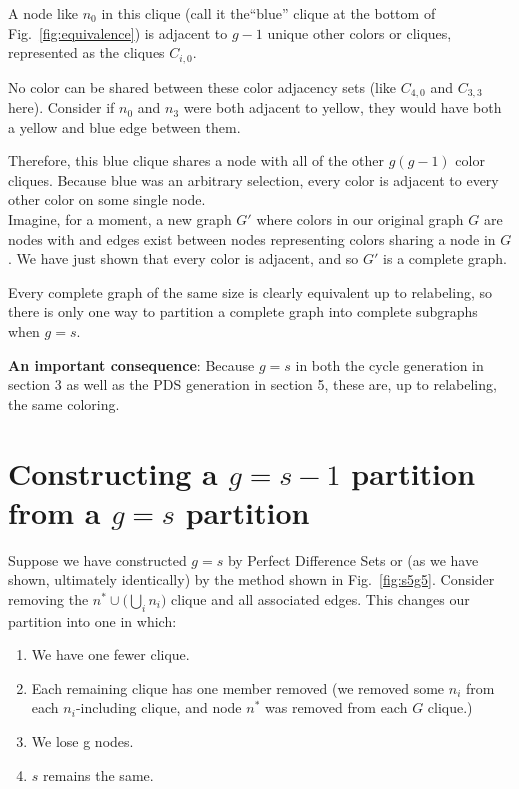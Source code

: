 \documentclass[11pt, oneside]{article} 	%
\begin{document}
A node like $n_0$ in this clique (call it the``blue'' clique at the bottom of Fig.~\ref{fig:equivalence}) is adjacent to $g-1$ unique other colors or cliques, represented as the cliques $C_{i,0}$.

No color can be shared between these color adjacency sets (like $C_{4,0}$ and $C_{3,3}$ here). Consider if $n_0$ and $n_3$ were both adjacent to yellow, they would have both a yellow and blue edge between them.

Therefore, this blue clique shares a node with all of the other $g(g-1)$ color cliques. Because blue was an arbitrary selection, every color is adjacent to every other color on some single node.
\\
Imagine, for a moment, a new graph $G'$ where colors in our original graph $G$ are nodes with and edges exist between nodes representing colors sharing a node in $G$. We have just shown that every color is adjacent, and so $G'$ is a complete graph. 

Every complete graph of the same size is clearly equivalent up to relabeling, so there is only one way to partition a complete graph into complete subgraphs when $g=s$.

\textbf{An important consequence}: Because $g=s$ in both the cycle generation in section 3 as well as the PDS generation in section 5, these are, up to relabeling, the same coloring.

\section{Constructing a $g=s-1$ partition from a $g=s$ partition}

Suppose we have constructed $g=s$ by Perfect Difference Sets or (as we have shown, ultimately identically) by the method shown in Fig.~\ref{fig:s5g5}. Consider removing the $n^* \cup \big( \bigcup_i n_i \big)$ clique and all associated edges. This changes our partition into one in which:
 
\begin{enumerate}
\item We have one fewer clique.
\item Each remaining clique has one member removed (we removed some $n_i$ from each $n_i$-including clique, and node $n^*$ was removed from each $G$ clique.)
\item We lose g nodes.
\item $s$ remains the same.
\end{enumerate}
\end{document}
